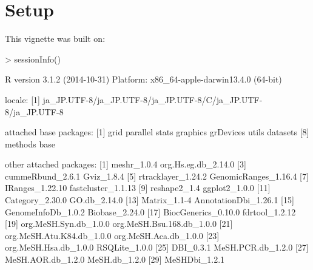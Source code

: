 \documentclass[11pt]{article}
\begin{document}
\clearpage
\section{Setup}

This vignette was built on:
\begin{Schunk}
\begin{Sinput}
> sessionInfo()
\end{Sinput}
\begin{Soutput}
R version 3.1.2 (2014-10-31)
Platform: x86_64-apple-darwin13.4.0 (64-bit)

locale:
[1] ja_JP.UTF-8/ja_JP.UTF-8/ja_JP.UTF-8/C/ja_JP.UTF-8/ja_JP.UTF-8

attached base packages:
[1] grid      parallel  stats     graphics  grDevices utils     datasets 
[8] methods   base     

other attached packages:
 [1] meshr_1.0.4               org.Hs.eg.db_2.14.0      
 [3] cummeRbund_2.6.1          Gviz_1.8.4               
 [5] rtracklayer_1.24.2        GenomicRanges_1.16.4     
 [7] IRanges_1.22.10           fastcluster_1.1.13       
 [9] reshape2_1.4              ggplot2_1.0.0            
[11] Category_2.30.0           GO.db_2.14.0             
[13] Matrix_1.1-4              AnnotationDbi_1.26.1     
[15] GenomeInfoDb_1.0.2        Biobase_2.24.0           
[17] BiocGenerics_0.10.0       fdrtool_1.2.12           
[19] org.MeSH.Syn.db_1.0.0     org.MeSH.Bsu.168.db_1.0.0
[21] org.MeSH.Atu.K84.db_1.0.0 org.MeSH.Aca.db_1.0.0    
[23] org.MeSH.Hsa.db_1.0.0     RSQLite_1.0.0            
[25] DBI_0.3.1                 MeSH.PCR.db_1.2.0        
[27] MeSH.AOR.db_1.2.0         MeSH.db_1.2.0            
[29] MeSHDbi_1.2.1            


\end{Soutput}
\end{Schunk}
\end{document}
